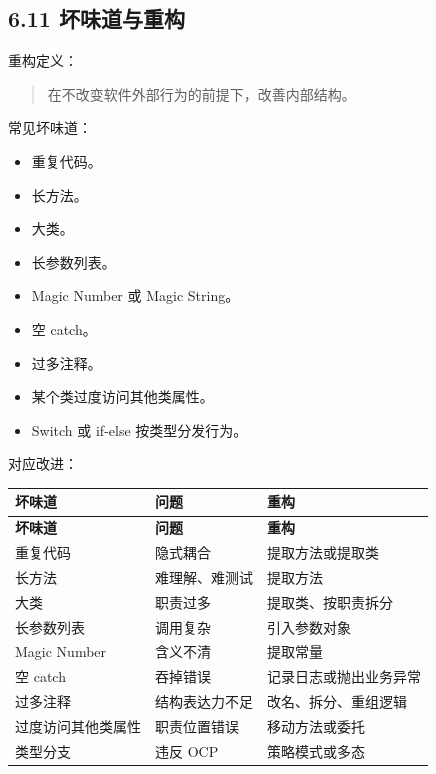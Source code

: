 \documentclass[UTF8,zihao=-4]{ctexart}
\begin{document}
\subsection{6.11 坏味道与重构}

重构定义：

\begin{quote}
在不改变软件外部行为的前提下，改善内部结构。
\end{quote}

常见坏味道：

\begin{itemize}
\item 重复代码。
\item 长方法。
\item 大类。
\item 长参数列表。
\item Magic Number 或 Magic String。
\item 空 catch。
\item 过多注释。
\item 某个类过度访问其他类属性。
\item Switch 或 if-else 按类型分发行为。
\end{itemize}

对应改进：

\begin{longtable}{|>{\raggedright\arraybackslash}p{}|>{\raggedright\arraybackslash}p{}|>{\raggedright\arraybackslash}p{}|}
\hline
\textbf{坏味道} & \textbf{问题} & \textbf{重构} \\
\hline
\endfirsthead
\hline
\textbf{坏味道} & \textbf{问题} & \textbf{重构} \\
\hline
\endhead
重复代码 & 隐式耦合 & 提取方法或提取类 \\
\hline
长方法 & 难理解、难测试 & 提取方法 \\
\hline
大类 & 职责过多 & 提取类、按职责拆分 \\
\hline
长参数列表 & 调用复杂 & 引入参数对象 \\
\hline
Magic Number & 含义不清 & 提取常量 \\
\hline
空 catch & 吞掉错误 & 记录日志或抛出业务异常 \\
\hline
过多注释 & 结构表达力不足 & 改名、拆分、重组逻辑 \\
\hline
过度访问其他类属性 & 职责位置错误 & 移动方法或委托 \\
\hline
类型分支 & 违反 OCP & 策略模式或多态 \\
\hline
\end{longtable}
\end{document}
